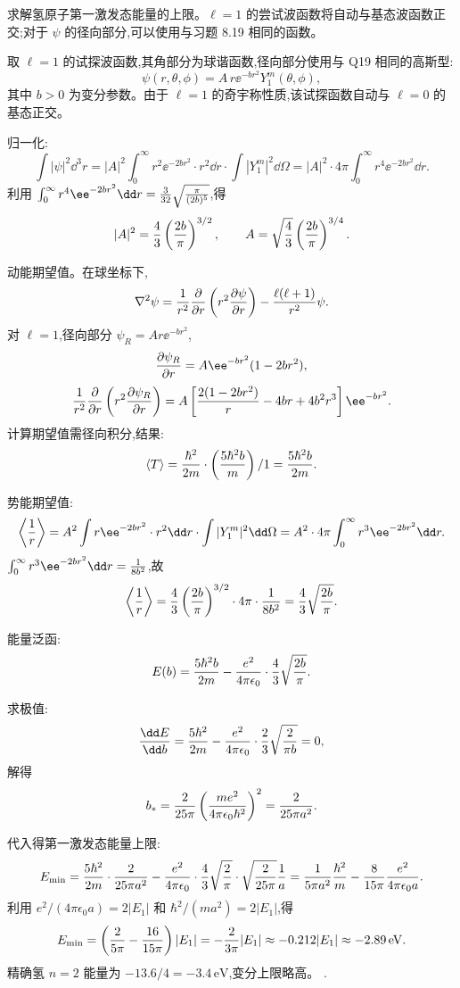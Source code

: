 \begin{question}
求解氢原子第一激发态能量的上限。$\ell=1$ 的尝试波函数将自动与基态波函数正交;对于 $\psi$ 的径向部分,可以使用与习题 8.19 相同的函数。
\end{question}
\begin{solution}
取 $\ell=1$ 的试探波函数,其角部分为球谐函数,径向部分使用与 Q19 相同的高斯型:
\[
\psi(r,\theta,\phi)=A\,r \ee^{-b r^2}Y_1^m(\theta,\phi),
\]
其中 $b>0$ 为变分参数。由于 $\ell=1$ 的奇宇称性质,该试探函数自动与 $\ell=0$ 的基态正交。

归一化:
\[
\int|\psi|^2\dd^3r=|A|^2\int_0^\infty r^2 \ee^{-2br^2}\cdot r^2\dd r
\cdot\int|Y_1^m|^2\dd\Omega
=|A|^2\cdot4\pi\int_0^\infty r^4 \ee^{-2br^2}\dd r.
\]
利用 $\int_0^\infty r^4 \ee^{-2br^2}\dd r={3\over32}\sqrt{\pi\over(2b)^5}$,得
\[
|A|^2={4\over3}\left({2b\over\pi}\right)^{3/2},\qquad
A=\sqrt{4\over3}\left({2b\over\pi}\right)^{3/4}.
\]

动能期望值。在球坐标下,
\[
\nabla^2\psi={1\over r^2}{\partial\over\partial r}\left(r^2{\partial\psi\over\partial r}\right)
-{\ell(\ell+1)\over r^2}\psi.
\]
对 $\ell=1$,径向部分 $\psi_R=A r \ee^{-br^2}$,
\[
{\partial\psi_R\over\partial r}=A \ee^{-br^2}(1-2br^2),
\]
\[
{1\over r^2}{\partial\over\partial r}\left(r^2{\partial\psi_R\over\partial r}\right)
=A\left[{2(1-2br^2)\over r}-4br+4b^2r^3\right]\ee^{-br^2}.
\]
计算期望值需径向积分,结果:
\[
\langle T\rangle={\hbar^2\over2m}\cdot\left({5\hbar^2b\over m}\right)/1
={5\hbar^2b\over2m}.
\]

势能期望值:
\[
\left\langle{1\over r}\right\rangle
=A^2\int r \ee^{-2br^2}\cdot r^2\dd r\cdot\int|Y_1^m|^2\dd\Omega
=A^2\cdot4\pi\int_0^\infty r^3 \ee^{-2br^2}\dd r.
\]
$\int_0^\infty r^3 \ee^{-2br^2}\dd r={1\over8b^2}$,故
\[
\left\langle{1\over r}\right\rangle
={4\over3}\left({2b\over\pi}\right)^{3/2}\cdot4\pi\cdot{1\over8b^2}
={4\over3}\sqrt{2b\over\pi}.
\]

能量泛函:
\[
E(b)={5\hbar^2b\over2m}-{e^2\over4\pi\epsilon_0}\cdot{4\over3}\sqrt{2b\over\pi}.
\]

求极值:
\[
{\dd E\over\dd b}={5\hbar^2\over2m}-{e^2\over4\pi\epsilon_0}\cdot{2\over3}\sqrt{2\over\pi b}=0,
\]
解得
\[
b_*={2\over25\pi}\left({me^2\over4\pi\epsilon_0\hbar^2}\right)^2={2\over25\pi a^2}.
\]

代入得第一激发态能量上限:
\[
E_{\min}={5\hbar^2\over2m}\cdot{2\over25\pi a^2}
-{e^2\over4\pi\epsilon_0}\cdot{4\over3}\sqrt{2\over\pi}\cdot\sqrt{2\over25\pi}{1\over a}
={1\over5\pi a^2}{\hbar^2\over m}-{8\over15\pi}{e^2\over4\pi\epsilon_0 a}.
\]
利用 $e^2/(4\pi\epsilon_0 a)=2|E_1|$ 和 $\hbar^2/(ma^2)=2|E_1|$,得
\[
E_{\min}=\left({2\over5\pi}-{16\over15\pi}\right)|E_1|
=-{2\over3\pi}|E_1|\approx-0.212|E_1|\approx-2.89\,\mathrm{eV}.
\]
精确氢 $n=2$ 能量为 $-13.6/4=-3.4\,\mathrm{eV}$,变分上限略高。
.
\end{solution}


